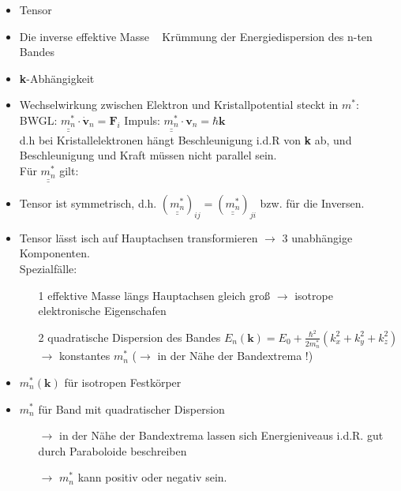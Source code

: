 \begin{itemize}
          \begin{itemize}
              \item Tensor
              \item Die inverse effektive Masse ~ Krümmung der Energiedispersion des n-ten Bandes
              \item \textbf{k}-Abhängigkeit
              \item Wechselwirkung zwischen Elektron und Kristallpotential steckt in $m^*$: \\
                    BWGL: $\underline{\underline{m_n^*}} \cdot \dot{\textbf{v}}_n = \textbf{F}_i$ Impuls: $\underline{\underline{m_n^*}} \cdot \textbf{v}_n = \hbar \textbf{k}$ \\
                    d.h bei Kristallelektronen hängt Beschleunigung i.d.R von \textbf{k} ab, und Beschleunigung und Kraft müssen nicht parallel sein. \\
                    Für $\underline{\underline{m_n^*}}$ gilt: \\
              \item Tensor ist symmetrisch, d.h. $(\underline{\underline{m_n^*}})_{ij} = (\underline{\underline{m_n^*}})_{ji}$ bzw. für die Inversen.
              \item Tensor lässt isch auf Hauptachsen transformieren $\rightarrow$ 3 unabhängige Komponenten.\\
                    Spezialfälle:
                    \begin{itemize}
                        \item[1] effektive Masse längs Hauptachsen gleich groß $\rightarrow$ isotrope elektronische Eigenschafen
                        \item[2] quadratische Dispersion des Bandes $E_n(\textbf{k}) = E_0 + \frac{\hbar^2}{2m_n^*}(k_x^2 + k_y^2 + k_z^2)$ $\rightarrow$  konstantes $m_n^*$ ($\rightarrow$  in der Nähe der Bandextrema !)
                    \end{itemize}
              \item $m_n^* (\textbf{k})$ für isotropen Festkörper
              \item $m_n^*$ für Band mit quadratischer Dispersion
                    \begin{itemize}
                        \item[$\rightarrow$] in der Nähe der Bandextrema lassen sich Energieniveaus i.d.R. gut durch Paraboloide beschreiben
                        \item[$\rightarrow$] $m_n^*$ kann positiv oder negativ sein.
                    \end{itemize}
          \end{itemize}
\end{itemize}



